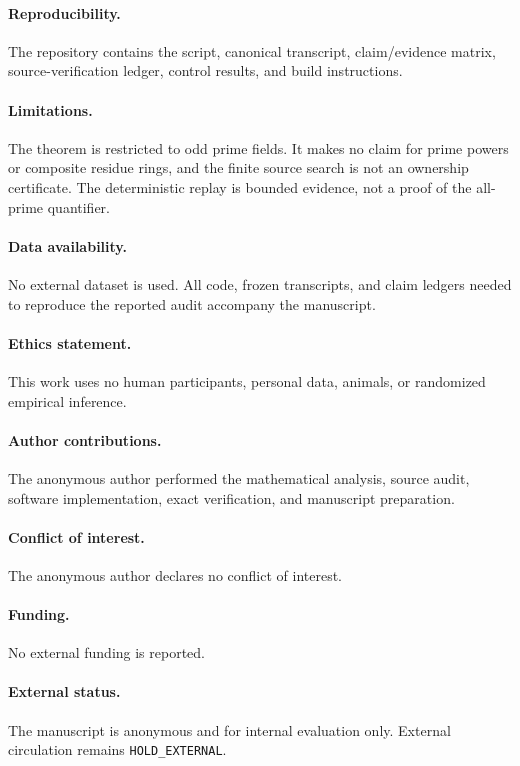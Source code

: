 \documentclass[10pt,a4paper]{amsart}
\theoremstyle{remark}
\begin{document}
\paragraph{Reproducibility.}
The repository contains the script, canonical transcript, claim/evidence
matrix, source-verification ledger, control results, and build instructions.

\paragraph{Limitations.}
The theorem is restricted to odd prime fields.  It makes no claim for prime
powers or composite residue rings, and the finite source search is not an
ownership certificate.  The deterministic replay is bounded evidence, not a
proof of the all-prime quantifier.

\paragraph{Data availability.}
No external dataset is used.  All code, frozen transcripts, and claim ledgers
needed to reproduce the reported audit accompany the manuscript.

\paragraph{Ethics statement.}
This work uses no human participants, personal data, animals, or randomized
empirical inference.

\paragraph{Author contributions.}
The anonymous author performed the mathematical analysis, source audit,
software implementation, exact verification, and manuscript preparation.

\paragraph{Conflict of interest.}
The anonymous author declares no conflict of interest.

\paragraph{Funding.}
No external funding is reported.

\paragraph{External status.}
The manuscript is anonymous and for internal evaluation only.  External
circulation remains \texttt{HOLD\_EXTERNAL}.



\end{document}
